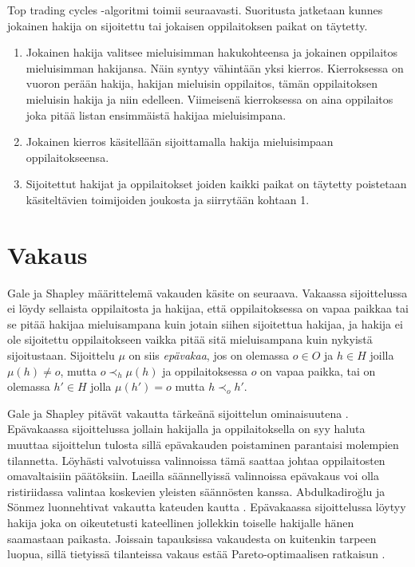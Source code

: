 \documentclass[gradu, twoside]{tktltiki}
\begin{document}
Top trading cycles -algoritmi toimii seuraavasti. Suoritusta jatketaan
kunnes jokainen hakija on sijoitettu tai jokaisen oppilaitoksen paikat
on täytetty.
\begin{enumerate}

\item Jokainen hakija valitsee mieluisimman hakukohteensa ja jokainen
  oppilaitos mieluisimman hakijansa. Näin syntyy vähintään yksi
  kierros. Kierroksessa on vuoron perään hakija, hakijan mieluisin
  oppilaitos, tämän oppilaitoksen mieluisin hakija ja niin edelleen.
  Viimeisenä kierroksessa on aina oppilaitos joka pitää listan
  ensimmäistä hakijaa mieluisimpana.

\item Jokainen kierros käsitellään sijoittamalla hakija mieluisimpaan
  oppilaitokseensa.

\item Sijoitettut hakijat ja oppilaitokset joiden kaikki paikat on
  täytetty poistetaan käsiteltävien toimijoiden joukosta ja siirrytään
  kohtaan 1.
\end{enumerate}

\section{Vakaus}

Gale ja Shapley määrittelemä vakauden käsite \cite{galeshapley62} on
seuraava. Vakaassa sijoittelussa ei löydy sellaista oppilaitosta ja
hakijaa, että oppilaitoksessa on vapaa paikkaa tai se pitää hakijaa
mieluisampana kuin jotain siihen sijoitettua hakijaa, ja hakija ei ole
sijoitettu oppilaitokseen vaikka pitää sitä mieluisampana kuin
nykyistä sijoitustaan. Sijoittelu $\mu$ on siis \emph{epävakaa}, jos
on olemassa $o \in O$ ja $h \in H$ joilla $\mu(h) \neq o$, mutta $o
\prec_h \mu(h)$ ja oppilaitoksessa $o$ on vapaa paikka, tai on
olemassa $h' \in H$ jolla $\mu(h') = o$ mutta $h \prec_o h'$.

Gale ja Shapley pitävät vakautta tärkeänä sijoittelun ominaisuutena
\cite{galeshapley62}. Epävakaassa sijoittelussa jollain hakijalla ja
oppilaitoksella on syy haluta muuttaa sijoittelun tulosta sillä
epävakauden poistaminen parantaisi molempien tilannetta. Löyhästi
valvotuissa valinnoissa tämä saattaa johtaa oppilaitosten
omavaltaisiin päätöksiin. Laeilla säännellyissä valinnoissa epävakaus
voi olla ristiriidassa valintaa koskevien yleisten säännösten kanssa.
Abdulkadiroğlu ja Sönmez luonnehtivat vakautta kateuden kautta
\cite{abdusön03}. Epävakaassa sijoittelussa löytyy hakija joka on
oikeutetusti kateellinen jollekkin toiselle hakijalle hänen saamastaan
paikasta. Joissain tapauksissa vakaudesta on kuitenkin tarpeen luopua,
sillä tietyissä tilanteissa vakaus estää Pareto-optimaalisen ratkaisun
\cite{ergin02}.
\end{document}
